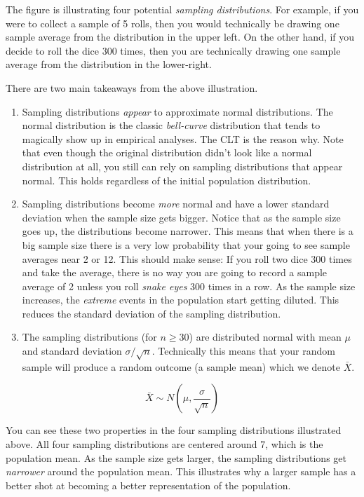 \documentclass[
]{book}
\begin{document}
The figure is illustrating four potential \emph{sampling distributions}. For example, if you were to collect a sample of 5 rolls, then you would technically be drawing one sample average from the distribution in the upper left. On the other hand, if you decide to roll the dice 300 times, then you are technically drawing one sample average from the distribution in the lower-right.

There are two main takeaways from the above illustration.

\begin{enumerate}
\def\labelenumi{\arabic{enumi}.}
\item
  Sampling distributions \emph{appear} to approximate normal distributions. The normal distribution is the classic \emph{bell-curve} distribution that tends to magically show up in empirical analyses. The CLT is the reason why. Note that even though the original distribution didn't look like a normal distribution at all, you still can rely on sampling distributions that appear normal. This holds regardless of the initial population distribution.
\item
  Sampling distributions become \emph{more} normal and have a lower standard deviation when the sample size gets bigger. Notice that as the sample size goes up, the distributions become narrower. This means that when there is a big sample size there is a very low probability that your going to see sample averages near 2 or 12. This should make sense: If you roll two dice 300 times and take the average, there is no way you are going to record a sample average of 2 unless you roll \emph{snake eyes} 300 times in a row. As the sample size increases, the \emph{extreme} events in the population start getting diluted. This reduces the standard deviation of the sampling distribution.
\item
  The sampling distributions (for \(n \geq 30\)) are distributed normal with mean \(\mu\) and standard deviation \(\sigma / \sqrt{n}\). Technically this means that your random sample will produce a random outcome (a sample mean) which we denote \(\bar{X}\).
\end{enumerate}

\[ \bar{X} \sim N \left( \mu, \frac{\sigma}{\sqrt{n}} \right) \]

You can see these two properties in the four sampling distributions illustrated above. All four sampling distributions are centered around 7, which is the population mean. As the sample size gets larger, the sampling distributions get \emph{narrower} around the population mean. This illustrates why a larger sample has a better shot at becoming a better representation of the population.
\end{document}
